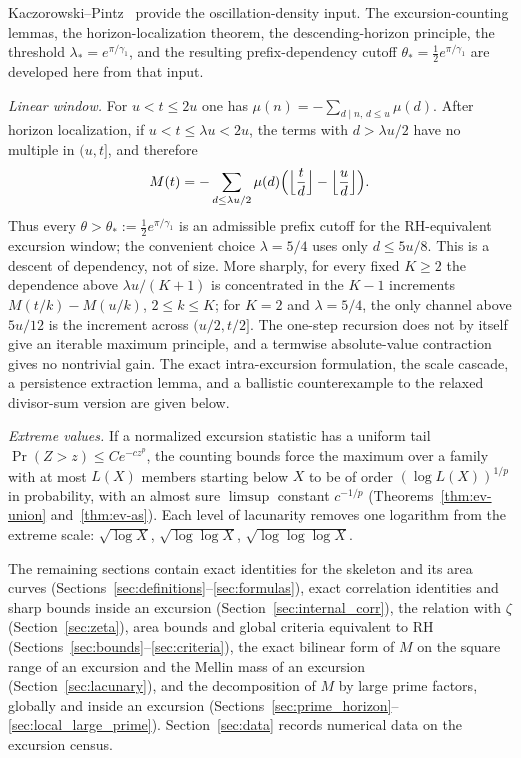 \documentclass[11pt]{amsart}
\numberwithin{equation}{section}
\theoremstyle{plain}
\theoremstyle{definition}
\theoremstyle{remark}
\begin{document}
Kaczorowski--Pintz~\cite{KP86} provide the oscillation-density input.  The
excursion-counting lemmas, the horizon-localization theorem, the
descending-horizon principle, the threshold
$\lambda_*=e^{\pi/\gamma_1}$, and the resulting prefix-dependency cutoff
$\theta_*=\tfrac12e^{\pi/\gamma_1}$ are developed here from that input.

\smallskip\noindent\emph{Linear window.} For $u<t\le2u$ one has
$\mu(n)=-\sum_{d\mid n,\,d\le u}\mu(d)$.  After horizon localization,
if $u<t\le\lambda u<2u$, the terms with $d>\lambda u/2$ have no multiple
in $(u,t]$, and therefore
\[
M(t)=-\sum_{d\le\lambda u/2}\mu(d)
\Bigl(\Bigl\lfloor\frac td\Bigr\rfloor-\Bigl\lfloor\frac ud\Bigr\rfloor\Bigr).
\]
Thus every $\theta>\theta_*:=\frac12e^{\pi/\gamma_1}$ is an admissible
prefix cutoff for the RH-equivalent excursion window; the convenient choice
$\lambda=5/4$ uses only $d\le5u/8$.  This is a descent of dependency, not
of size.  More sharply, for every fixed $K\ge2$ the dependence above
$\lambda u/(K+1)$ is concentrated in the $K-1$ increments
$M(t/k)-M(u/k)$, $2\le k\le K$; for $K=2$ and $\lambda=5/4$, the only channel
above $5u/12$ is the increment across $(u/2,t/2]$.  The one-step recursion
does not by itself give an iterable maximum principle, and a termwise
absolute-value contraction gives no nontrivial gain.  The exact
intra-excursion formulation, the scale cascade, a persistence extraction
lemma, and a ballistic counterexample to the relaxed divisor-sum version are
given below.

\smallskip\noindent\emph{Extreme values.} If a normalized excursion statistic
has a uniform tail $\Pr(Z>z)\le Ce^{-cz^p}$, the counting bounds force the
maximum over a family with at most $L(X)$ members starting below $X$ to be
of order $(\log L(X))^{1/p}$ in probability, with an almost sure $\limsup$ constant
$c^{-1/p}$ (Theorems~\ref{thm:ev-union} and~\ref{thm:ev-as}). Each level of
lacunarity removes one logarithm from the extreme scale:
$\sqrt{\log X}$, $\sqrt{\log\log X}$, $\sqrt{\log\log\log X}$.

\smallskip
The remaining sections contain exact identities for the skeleton and its area
curves (Sections~\ref{sec:definitions}--\ref{sec:formulas}), exact
correlation identities and sharp bounds inside an excursion
(Section~\ref{sec:internal_corr}), the relation with $\zeta$
(Section~\ref{sec:zeta}), area bounds and global criteria equivalent to RH
(Sections~\ref{sec:bounds}--\ref{sec:criteria}), the exact bilinear form of
$M$ on the square range of an excursion and the Mellin mass of an excursion
(Section~\ref{sec:lacunary}), and the decomposition of $M$ by large prime
factors, globally and inside an excursion
(Sections~\ref{sec:prime_horizon}--\ref{sec:local_large_prime}).
Section~\ref{sec:data} records numerical data on the excursion census.
\end{document}
